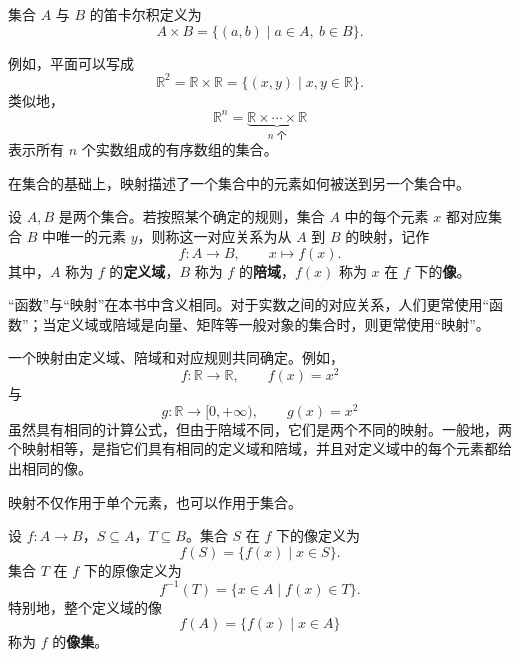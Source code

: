\begin{definition}[笛卡尔积]
    集合 \(A\) 与 \(B\) 的笛卡尔积定义为
    \[
        A\times B=\{(a,b)\mid a\in A,\ b\in B\}.
    \]
\end{definition}

例如，平面可以写成
\[
    \mathbb{R}^2=\mathbb{R}\times\mathbb{R}
    =\{(x,y)\mid x,y\in\mathbb{R}\}.
\]
类似地，
\[
    \mathbb{R}^n
    =\underbrace{\mathbb{R}\times\cdots\times\mathbb{R}}_{n\text{ 个}}
\]
表示所有 \(n\) 个实数组成的有序数组的集合。


在集合的基础上，映射描述了一个集合中的元素如何被送到另一个集合中。

\begin{definition}[映射]
    设 \(A,B\) 是两个集合。若按照某个确定的规则，集合 \(A\) 中的每个元素 \(x\) 都对应集合 \(B\) 中唯一的元素 \(y\)，则称这一对应关系为从 \(A\) 到 \(B\) 的映射，记作
    \[
        f:A\longrightarrow B,\qquad x\longmapsto f(x).
    \]
    其中，\(A\) 称为 \(f\) 的\textbf{定义域}，\(B\) 称为 \(f\) 的\textbf{陪域}，\(f(x)\) 称为 \(x\) 在 \(f\) 下的\textbf{像}。
\end{definition}

“函数”与“映射”在本书中含义相同。对于实数之间的对应关系，人们更常使用“函数”；当定义域或陪域是向量、矩阵等一般对象的集合时，则更常使用“映射”。

一个映射由定义域、陪域和对应规则共同确定。例如，
\[
    f:\mathbb{R}\longrightarrow\mathbb{R},
    \qquad f(x)=x^2
\]
与
\[
    g:\mathbb{R}\longrightarrow[0,+\infty),
    \qquad g(x)=x^2
\]
虽然具有相同的计算公式，但由于陪域不同，它们是两个不同的映射。一般地，两个映射相等，是指它们具有相同的定义域和陪域，并且对定义域中的每个元素都给出相同的像。


映射不仅作用于单个元素，也可以作用于集合。

\begin{definition}[像集与原像集]
    设 \(f:A\to B\)，\(S\subseteq A\)，\(T\subseteq B\)。集合 \(S\) 在 \(f\) 下的像定义为
    \[
        f(S)=\{f(x)\mid x\in S\}.
    \]
    集合 \(T\) 在 \(f\) 下的原像定义为
    \[
        f^{-1}(T)=\{x\in A\mid f(x)\in T\}.
    \]
    特别地，整个定义域的像
    \[
        f(A)=\{f(x)\mid x\in A\}
    \]
    称为 \(f\) 的\textbf{像集}。
\end{definition}
